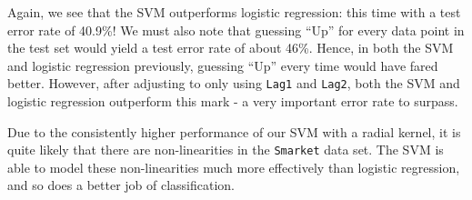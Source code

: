 \documentclass[12pt]{article}\usepackage[]{graphicx}\usepackage[]{color}
\begin{document}
Again, we see that the SVM outperforms logistic regression: this time with a test error rate of 40.9\%! We must also note that guessing ``Up'' for every data point in the test set would yield a test error rate of about 46\%. Hence, in both the SVM and logistic regression previously, guessing ``Up'' every time would have fared better. However, after adjusting to only using \texttt{Lag1} and \texttt{Lag2}, both the SVM and logistic regression outperform this mark - a very important error rate to surpass.

Due to the consistently higher performance of our SVM with a radial kernel, it is quite likely that there are non-linearities in the \texttt{Smarket} data set. The SVM is able to model these non-linearities much more effectively than logistic regression, and so does a better job of classification.
\end{document}

